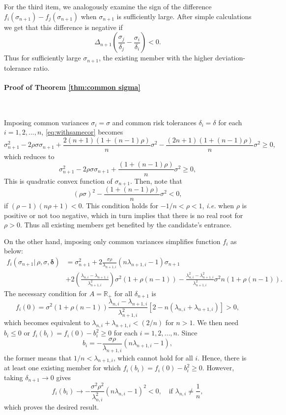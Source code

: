 \documentclass[fleqn,mnsc,nonblindrev]{informs4}
\begin{document}
For the third item, we analogously examine the sign of the difference $f_i(\sigma_{n+1})-f_j(\sigma_{n+1})$ when $\sigma_{n+1}$ is sufficiently large. After simple calculations we get that this difference is negative if 
\[   \Delta_{n+1}\left(\frac{\sigma_j}{\delta_j}-\frac{\sigma_i}{\delta_i} \right)<0. 
\]
Thus for sufficiently large $\sigma_{n+1}$, the existing member with the higher deviation-tolerance ratio.

\paragraph{Proof of Theorem \ref{thm:common sigma}}
\

Imposing common variances $\sigma_i=\sigma $ and common risk tolerances $\delta_i=\delta$ for each $i=1,2,...,n$, \eqref{eq:withsamecor} becomes
\[
\sigma_{n+1}^2-2\rho\sigma\sigma_{n+1}+\frac{2(n+1)(1+(n-1)\rho)}{n}\sigma^2-\frac{(2n+1)(1+(n-1)\rho)}{n}\sigma^2\geq 0,
\]
which reduces to
\[
\sigma_{n+1}^2-2\rho\sigma\sigma_{n+1}+\frac{(1+(n-1)\rho)}{n}\sigma^2\geq 0,
\]
This is quadratic convex function of $\sigma_{n+1}$. Then, note that
\[
(\rho\sigma)^2-\frac{(1+(n-1)\rho)}{n}\sigma^2<0,
\]
if $(\rho-1)(n\rho+1)<0$. This condition holds for $-1/n<\rho<1$, {\it i.e.} when $\rho$ is positive or not too negative, which in turn implies that there is no real root for $\rho>0$. Thus all existing members get benefited by the candidate's entrance.

On the other hand, imposing only common variances simplifies function $f_i$ as below:
\begin{align*}
f_i(\sigma_{n+1}|\,\rho,\sigma,\boldsymbol{\delta}) &=\sigma_{n+1}^2+2 \frac{\sigma\rho}{\lambda_{n+1,i}} \left(n\lambda_{n+1,i}-1\right)\sigma_{n+1}\\
&+2\left(\frac{\lambda_{n,i}-\lambda_{n+1,i}}{\lambda_{n+1,i}^2}\right)\sigma^2\left(1+\rho(n-1)\right)-\frac{\lambda_{n,i}^2-\lambda_{n+1,i}^2}{\lambda_{n+1,i}^2}\sigma^2n\left(1+\rho(n-1) \right).
\end{align*}
The necessary condition for $A=\mathbb{R}_+$ for all $\delta_{n+1}$ is 
\[
f_i(0) = \sigma^2(1 + \rho(n - 1)) \frac{\lambda_{n,i} - \lambda_{n+1,i}}{\lambda_{n+1,i}^2} \left[ 2 - n(\lambda_{n,i} + \lambda_{n+1,i}) \right]>0,
\]
which becomes equivalent to $\lambda_{n,i}+\lambda_{n+1,i}<(2/n)$ for $n>1$. We then need $b_i\leq 0$ or $f_i(b_i)=f_i(0)-b_i^2\geq 0$ for each $i=1,2,...,n$. Since
\[
b_i = -\frac{\sigma \rho}{\lambda_{n+1,i}} (n\lambda_{n+1,i} - 1),
\]
the former means that $1/n<\lambda_{n+1,i}$, which cannot hold for all $i$. Hence, there is at least one existing member for which $f_i(b_i)=f_i(0)-b_i^2\geq 0$. However, taking $\delta_{n+1}\to0$ gives
\[
f_i(b_i) \to -\frac{\sigma^2 \rho^2}{\lambda_{n,i}^2}(n\lambda_{n,i} - 1)^2 < 0,
\quad \text{if } \lambda_{n,i} \neq \frac{1}{n},
\]
which proves the desired result.
\end{document}
